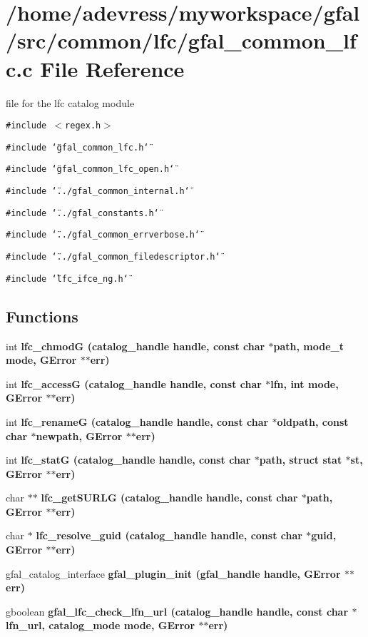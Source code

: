 \section{/home/adevress/myworkspace/gfal/src/common/lfc/gfal\_\-common\_\-lfc.c File Reference}
\label{gfal__common__lfc_8c}
file for the lfc catalog module 

{\tt \#include $<$regex.h$>$}\par
{\tt \#include \char`\"{}gfal\_\-common\_\-lfc.h\char`\"{}}\par
{\tt \#include \char`\"{}gfal\_\-common\_\-lfc\_\-open.h\char`\"{}}\par
{\tt \#include \char`\"{}../gfal\_\-common\_\-internal.h\char`\"{}}\par
{\tt \#include \char`\"{}../gfal\_\-constants.h\char`\"{}}\par
{\tt \#include \char`\"{}../gfal\_\-common\_\-errverbose.h\char`\"{}}\par
{\tt \#include \char`\"{}../gfal\_\-common\_\-filedescriptor.h\char`\"{}}\par
{\tt \#include \char`\"{}lfc\_\-ifce\_\-ng.h\char`\"{}}\par
\subsection*{Functions}
\begin{CompactItemize}
\item 
int \bf{lfc\_\-chmod\-G} (catalog\_\-handle handle, const char $\ast$path, mode\_\-t mode, GError $\ast$$\ast$err)
\item 
int \bf{lfc\_\-access\-G} (catalog\_\-handle handle, const char $\ast$lfn, int mode, GError $\ast$$\ast$err)
\item 
int \bf{lfc\_\-rename\-G} (catalog\_\-handle handle, const char $\ast$oldpath, const char $\ast$newpath, GError $\ast$$\ast$err)
\item 
int \bf{lfc\_\-stat\-G} (catalog\_\-handle handle, const char $\ast$path, struct stat $\ast$st, GError $\ast$$\ast$err)
\item 
char $\ast$$\ast$ \bf{lfc\_\-get\-SURLG} (catalog\_\-handle handle, const char $\ast$path, GError $\ast$$\ast$err)
\item 
char $\ast$ \bf{lfc\_\-resolve\_\-guid} (catalog\_\-handle handle, const char $\ast$guid, GError $\ast$$\ast$err)
\item 
gfal\_\-catalog\_\-interface \bf{gfal\_\-plugin\_\-init} (gfal\_\-handle handle, GError $\ast$$\ast$err)
\item 
gboolean \bf{gfal\_\-lfc\_\-check\_\-lfn\_\-url} (catalog\_\-handle handle, const char $\ast$lfn\_\-url, catalog\_\-mode mode, GError $\ast$$\ast$err)
\end{CompactItemize}


